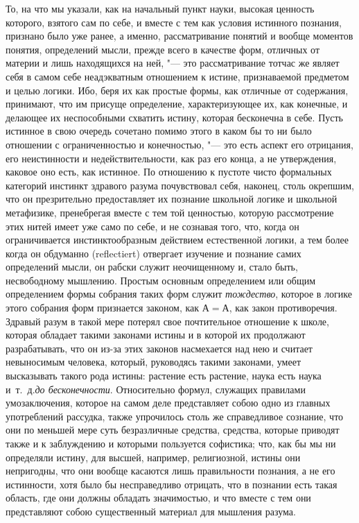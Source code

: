То, на что мы указали, как на начальный пункт науки, высокая ценность
которого, взятого сам по себе, и вместе с тем как условия истинного
познания, признано было уже ранее, а именно, рассматривание понятий и
вообще моментов понятия, определений мысли, прежде всего в качестве форм,
отличных от материи и лишь находящихся на ней, "--- это рассматривание тотчас
же являет себя в самом себе неадэкватным отношением к истине, признаваемой
предметом и целью логики. Ибо, беря их как простые формы, как отличные от
содержания, принимают, что им присуще определение, характеризующее их, как
конечные, и делающее их неспособными схватить истину, которая бесконечна в
себе. Пусть истинное в свою очередь сочетано помимо этого в каком бы то ни
было отношении с ограниченностью и конечностью, "--- это есть аспект его
отрицания, его неистинности и недействительности, как раз его конца, а не
утверждения, каковое оно есть, как истинное. По отношению к пустоте чисто
формальных категорий инстинкт здравого разума почувствовал себя, наконец,
столь окрепшим, что он презрительно предоставляет их познание школьной
логике и школьной метафизике, пренебрегая вместе с тем той ценностью,
которую рассмотрение этих нитей имеет уже само по себе, и не сознавая того,
что, когда он ограничивается инстинктообразным действием естественной
логики, а тем более когда он обдуманно (reflectiert) отвергает изучение и
познание самих определений мысли, он рабски служит неочищенному и, стало
быть, несвободному мышлению. Простым основным определением или общим
определением формы собрания таких форм служит
{\em тождество}, которое в логике этого собрания форм
признается законом, как $А=А$, как закон противоречия. Здравый разум
в такой мере потерял свое почтительное отношение к школе, которая обладает
такими законами истины и в которой их продолжают разрабатывать, что он
из-за этих законов насмехается над нею и считает невыносимым человека,
который, руководясь такими законами, умеет высказывать такого рода истины:
растение есть растение, наука есть наука и~т.~д.{\em до бесконечности}.
Относительно формул, служащих правилами умозаключения,
которое на самом деле представляет собою одно из главных употреблений
рассудка, также упрочилось столь же справедливое сознание, что они по
меньшей мере суть безразличные средства, средства, которые приводят также и
к заблуждению и которыми пользуется софистика; что, как бы мы ни определяли
истину, для высшей, например, религиозной, истины они непригодны, что они
вообще касаются лишь правильности познания, а не его истинности, хотя было
бы несправедливо отрицать, что в познании есть такая область, где они
должны обладать значимостью, и что вместе с тем они представляют собою
существенный материал для мышления разума.

